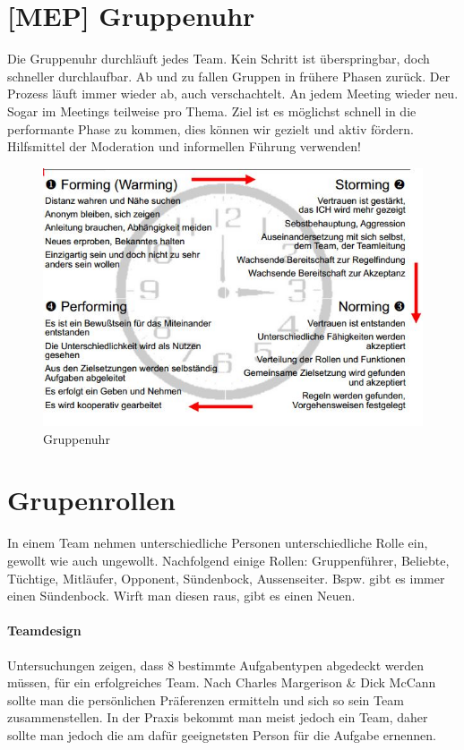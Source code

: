 \section{[MEP] Gruppenuhr}
Die Gruppenuhr durchläuft jedes Team. Kein Schritt ist überspringbar, doch schneller durchlaufbar. Ab und zu fallen Gruppen in frühere Phasen zurück. Der Prozess läuft immer wieder ab, auch verschachtelt. An jedem Meeting wieder neu. Sogar im Meetings teilweise pro Thema. Ziel ist es möglichst schnell in die performante Phase zu kommen, dies können wir gezielt und aktiv fördern. Hilfsmittel der Moderation und informellen Führung verwenden!
\begin{figure}[h!]
\centering
\includegraphics[width=0.7\linewidth]{fig/teamentwicklung-gruppenuhr}
\caption{Gruppenuhr}
\label{fig:teamentwicklung-gruppenuhr}
\end{figure}

\section{Grupenrollen}
In einem Team nehmen unterschiedliche Personen unterschiedliche Rolle ein, gewollt wie auch ungewollt. Nachfolgend einige Rollen: Gruppenführer, Beliebte, Tüchtige, Mitläufer, Opponent, Sündenbock, Aussenseiter. Bspw. gibt es immer einen Sündenbock. Wirft man diesen raus, gibt es einen Neuen.

\paragraph{Teamdesign} 
Untersuchungen zeigen, dass 8 bestimmte Aufgabentypen abgedeckt werden müssen, für ein erfolgreiches Team. Nach Charles Margerison \& Dick McCann sollte man die persönlichen Präferenzen ermitteln und sich so sein Team zusammenstellen. In der Praxis bekommt man meist jedoch ein Team, daher sollte man jedoch die am dafür geeignetsten Person für die Aufgabe ernennen.

